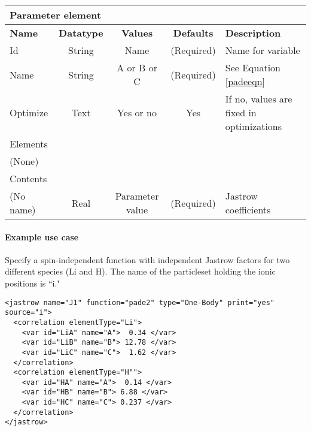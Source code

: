 \begin{table}[h]
\begin{center}
\begin{tabular}{l c c c l }
\hline
\multicolumn{5}{l}{Parameter element} \\
\hline
\bfseries Name & \bfseries Datatype & \bfseries Values & \bfseries Defaults & \bfseries Description \\
\hline
Id & String & Name & (Required) & Name for variable \\
Name & String & A or B or C & (Required) & See Equation \ref{padeeqn}\\
Optimize & Text & Yes or no & Yes & If no, values are fixed in optimizations \\
\hline
\multicolumn{5}{l}{Elements}\\ \hline
(None) & & & \\ \hline
\multicolumn{5}{l}{Contents}\\ \hline
 (No name) & Real & Parameter value & (Required) & Jastrow coefficients \\ \hline
\end{tabular}
\end{center}
\end{table}

\paragraph{Example use case}
\label{sec:1bjpadeexamples}

Specify a spin-independent function with independent Jastrow factors for two different species (Li and H).
The name of the particleset holding the ionic positions is ``i."
\begin{lstlisting}[style=QMCPXML]
<jastrow name="J1" function="pade2" type="One-Body" print="yes" source="i">
  <correlation elementType="Li">
    <var id="LiA" name="A">  0.34 </var>
    <var id="LiB" name="B"> 12.78 </var>
    <var id="LiC" name="C">  1.62 </var>
  </correlation>
  <correlation elementType="H"">
    <var id="HA" name="A">  0.14 </var>
    <var id="HB" name="B"> 6.88 </var>
    <var id="HC" name="C"> 0.237 </var>
  </correlation>
</jastrow>
\end{lstlisting}
